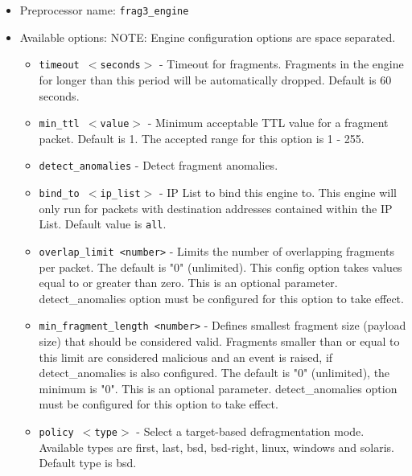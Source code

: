 \documentclass[english]{report}
\begin{document}
\begin{itemize}

\item Preprocessor name: \texttt{frag3\_engine}

\item Available options:
  NOTE: Engine configuration options are space separated.

\begin{itemize}

\item \texttt{timeout $<$seconds$>$} - Timeout for fragments.  Fragments in the
engine for longer than this period will be automatically dropped.  Default is
60 seconds.
                        
\item \texttt{min\_ttl $<$value$>$} - Minimum acceptable TTL value for a
fragment packet.  Default is 1. The accepted range for this option is 1 - 255.
                       
\item \texttt{detect\_anomalies} - Detect fragment anomalies.
     
\item \texttt{bind\_to $<$ip\_list$>$} - IP List to bind this engine to.  This
engine will only run for packets with destination addresses contained within
the IP List.  Default value is \texttt{all}.
                         
\item \texttt{overlap\_limit <number>} - Limits the number of overlapping
fragments per packet.  The default is "0" (unlimited). This config option takes
values equal to or greater than zero. This is an optional parameter. 
detect\_anomalies option must be configured for this option to take effect.

\item \texttt{min\_fragment\_length <number>} - Defines smallest fragment size
(payload size) that should be considered valid.  Fragments smaller than or
equal to this limit are considered malicious and an event is raised, if
detect\_anomalies is also configured.  The default is "0" (unlimited), the
minimum is "0".  This is an optional parameter.  detect\_anomalies option 
must be configured for this option to take effect.

\item \texttt{policy $<$type$>$} - Select a target-based defragmentation mode.
Available types are first, last, bsd, bsd-right, linux, windows and solaris.
Default type is bsd.


\end{itemize}
\end{itemize}
\end{document}
